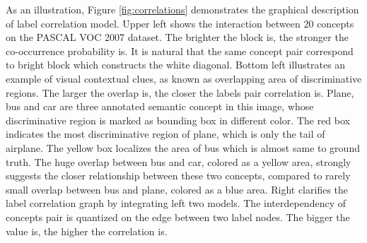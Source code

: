 As an illustration, Figure \ref{fig:correlations} demonstrates the graphical description of label correlation model. Upper left shows the interaction between 20 concepts on the PASCAL VOC 2007 dataset. The brighter the block is, the stronger the co-occurrence probability is. It is natural that the same concept pair correspond to bright block which constructs the white diagonal. Bottom left illustrates an example of visual contextual clues, as known as overlapping area of discriminative regions. The larger the overlap is, the closer the labels pair correlation is. Plane, bus and car are three annotated semantic concept in this image, whose discriminative region is marked as bounding box in different color. The red box indicates the most discriminative region of plane, which is only the tail of airplane. The yellow box localizes the area of bus which is almost same to ground truth. The huge overlap between bus and car, colored as a yellow area, strongly suggests the closer relationship between these two concepts, compared to rarely small overlap between bus and plane, colored as a blue area. Right clarifies the label correlation graph by integrating left two models. The interdependency of concepts pair is quantized on the edge between two label nodes. The bigger the value is, the higher the correlation is.

